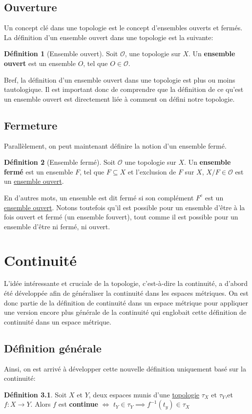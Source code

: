 \documentclass[12pt]{book}
\theoremstyle{definition}
\newtheorem{definition}{Définition}[section]
\begin{document}
\section{Ouverture}
Un concept clé dans une topologie est le concept d'ensembles ouverts et fermés. La définition d'un ensemble ouvert dans 
une topologie est la suivante:
\begin{definition}[Ensemble ouvert]
    \label{def:topologie_ouvert}
    Soit $\mathcal{O}$, une topologie sur $X$. Un \textbf{ensemble ouvert} est un ensemble $O$, tel que $O \in \mathcal{O}$.
\end{definition}
Bref, la définition d'un ensemble ouvert dans une topologie est plus ou moins tautologique. Il est important donc 
de comprendre que la définition de ce qu'est un ensemble ouvert est directement liée à comment on défini notre topologie.

\section{Fermeture}
Parallèlement, on peut maintenant définire la notion d'un ensemble fermé.
\begin{definition}[Ensemble fermé]
    \label{def:topologie_ferme}
    Soit $\mathcal{O}$ une topologie sur $X$. Un \textbf{ensemble fermé} est un ensemble $F$, tel que $F \subseteq X$ et
    l'exclusion de $F$ sur $X$, $X / F \in \mathcal{O}$ est un \hyperref[def:topologie_ouvert]{ensemble ouvert}.
\end{definition}

En d'autres mots, un ensemble est dit fermé si son complément $F^c$ est un \hyperref[def:topologie_ouvert]{ensemble ouvert}.
Notons toutefois qu'il est possible pour un ensemble d'être à la fois ouvert et fermé (un ensemble fouvert), tout comme il est 
possible pour un ensemble d'être ni fermé, ni ouvert.

\chapter{Continuité}
L'idée intéressante et cruciale de la topologie, c'est-à-dire la continuité, a d'abord été développée afin de généraliser 
la continuité dans les espaces métriques. On est donc partie de la définition de continuité dans un espace métrique pour 
appliquer une version encore plus générale de la continuité qui englobait cette définition de continuité dans un espace métrique.

\section{Définition générale}
Ainsi, on est arrivé à développer cette nouvelle définition uniquement basé sur la continuité:
\begin{definition}
    Soit $X$ et $Y$, deux espaces munis d'une \hyperref[def:topologie]{topologie} $\tau_X$ et $\tau_Y$,et $f: X \to Y$.
    Alors $f$ est \textbf{continue} $\iff$ $t_Y \in \tau_Y \implies f^{-1}(t_y) \in \tau_X$
\end{definition}
\end{document}
